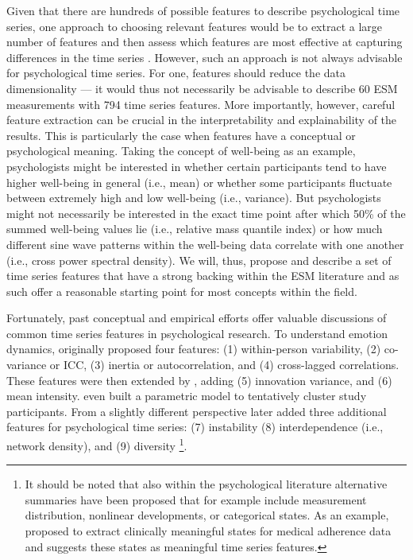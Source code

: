 \documentclass[man, 12pt, a4paper, mask, floatsintext]{apa7}
\theoremstyle{break}
\theoremstyle{plain}
\begin{document}
Given that there are hundreds of possible features to describe psychological time series, one approach to choosing relevant features would be to extract a large number of features and then assess which features are most effective at capturing differences in the time series \citep[e.g.,][]{christ2018}. However, such an approach is not always advisable for psychological time series. For one, features should reduce the data dimensionality --- it would thus not necessarily be advisable to describe 60 ESM measurements with 794 time series features. More importantly, however, careful feature extraction can be crucial in the interpretability and explainability of the results. This is particularly the case when features have a conceptual or psychological meaning. Taking the concept of well-being as an example, psychologists might be interested in whether certain participants tend to have higher well-being in general (i.e., mean) or whether some participants fluctuate between extremely high and low well-being (i.e., variance). But psychologists might not necessarily be interested in the exact time point after which 50\% of the summed well-being values lie (i.e., relative mass quantile index) or how much different sine wave patterns within the well-being data correlate with one another (i.e., cross power spectral density). We will, thus, propose and describe a set of time series features that have a strong backing within the ESM literature and as such offer a reasonable starting point for most concepts within the field.

Fortunately, past conceptual and empirical efforts offer valuable discussions of common time series features in psychological research. To understand emotion dynamics, \citet{kuppens2017} originally proposed four features: (1) within-person variability, (2) co-variance or ICC, (3) inertia or autocorrelation, and (4) cross-lagged correlations. These features were then extended by \citet{krone2018}, adding (5) innovation variance, and (6) mean intensity. \citet{krone2018} even built a parametric model to tentatively cluster study participants. From a slightly different perspective \citet{dejonckheere2019} later added three additional features for psychological time series: (7) instability (8) interdependence (i.e., network density), and (9) diversity \citep[i.e., Gini coefficient; also see][]{wendt2020}\footnote{It should be noted that also within the psychological literature alternative summaries have been proposed that for example include measurement distribution, nonlinear developments, or categorical states. As an example, \citet{kiwuwa-muyingo2011} proposed to extract clinically meaningful states for medical adherence data and suggests these states as meaningful time series features.}. 
\end{document}
